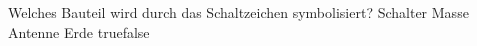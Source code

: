     {Welches Bauteil wird durch das Schaltzeichen symbolisiert?}
    {Schalter}
    {Masse}
    {Antenne}
    {Erde}
    {true}{false}